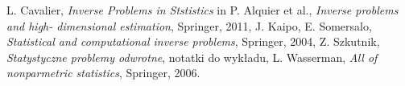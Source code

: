\documentclass[10pt]{mwart}
\begin{document}
\begin{thebibliography}{4}
L. Cavalier, \emph{Inverse Problems in Ststistics} in P. Alquier et al., \emph{Inverse problems and high- dimensional estimation}, Springer, 2011,
J. Kaipo, E. Somersalo, \emph{Statistical and computational inverse problems}, Springer, 2004,
Z. Szkutnik, \emph{Statystyczne problemy odwrotne}, notatki do wykładu,
L. Wasserman, \emph{All of nonparmetric statistics}, Springer, 2006.
\end{thebibliography}
\end{document}
